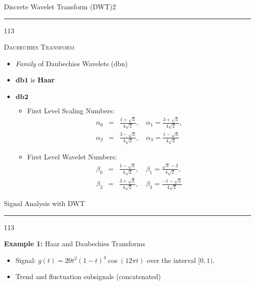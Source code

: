 \documentclass[a4,portrait,slidesonly]{seminar}
\begin{document}
\begin{slide*}
{\large \textsf{Discrete Wavelet Transform (DWT)\hfill{2}}}\\
\hrule
\vspace{10pt}
\begin{dinglist} {113}
\item \textsc{Daubechies Transform}
    \begin{itemize}
    \item \emph{Family} of Daubechies Wavelets (dbn)
    \item $\mathbf{db1}$ is \textbf{Haar}
    \item $\mathbf{db2}$
            \begin{itemize}
            \item First Level Scaling Numbers:
            \begin{eqnarray*}
            \alpha_{0} &=& \frac{1+\sqrt{3}}{4\sqrt{2}}, \quad \alpha_{1}=\frac{3+\sqrt{3}}{4\sqrt{2}}, \\
            \alpha_{2} &=& \frac{3-\sqrt{3}}{4\sqrt{2}}, \quad \alpha_{3}=\frac{1-\sqrt{3}}{4\sqrt{2}}
            \end{eqnarray*}
            \item First Level Wavelet Numbers:
            \begin{eqnarray*}
            \beta_{0} &=& \frac{1-\sqrt{3}}{4\sqrt{2}}, \quad \beta_{1}=\frac{\sqrt{3}-3}{4\sqrt{2}}, \\
            \beta_{2} &=& \frac{3+\sqrt{3}}{4\sqrt{2}}, \quad \beta_{3}=\frac{-1-\sqrt{3}}{4\sqrt{2}}
            \end{eqnarray*}
            \end{itemize}
    \end{itemize}
\end{dinglist}
\end{slide*}

\begin{slide*}
{\large \textsf{Signal Analysis with DWT}}\\
\hrule
\vspace{10pt}
\begin{dinglist} {113}
\item \textbf{Example 1:} Haar and Daubechies Transforms
    \begin{itemize}
    \item Signal: $g(t)=20t^{2}(1-t)^{4}\cos(12\pi t)$ over the interval $[0,1)$. 
    \item Trend and fluctuation subsignals (concatenated) 
    \end{itemize}
\end{dinglist}
\end{slide*}
\end{document}
